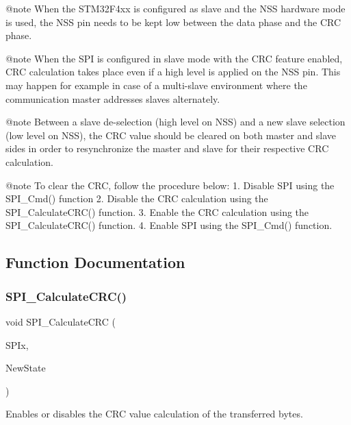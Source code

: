 \begin{DoxyVerb}
@note When the STM32F4xx is configured as slave and the NSS hardware mode is 
      used, the NSS pin needs to be kept low between the data phase and the CRC 
      phase.

@note When the SPI is configured in slave mode with the CRC feature enabled, CRC
      calculation takes place even if a high level is applied on the NSS pin. 
      This may happen for example in case of a multi-slave environment where the 
      communication master addresses slaves alternately.

@note Between a slave de-selection (high level on NSS) and a new slave selection 
      (low level on NSS), the CRC value should be cleared on both master and slave
      sides in order to resynchronize the master and slave for their respective 
      CRC calculation.

@note To clear the CRC, follow the procedure below:
        1. Disable SPI using the SPI_Cmd() function
        2. Disable the CRC calculation using the SPI_CalculateCRC() function.
        3. Enable the CRC calculation using the SPI_CalculateCRC() function.
        4. Enable SPI using the SPI_Cmd() function.\end{DoxyVerb}
 

\subsection{Function Documentation}
\mbox{\label{group__SPI__Group3_ga64f7276d119e6cb58afc100f8832adb0}} 
\subsubsection{S\+P\+I\+\_\+\+Calculate\+C\+R\+C()}
{\footnotesize\ttfamily void S\+P\+I\+\_\+\+Calculate\+C\+RC (\begin{DoxyParamCaption}\item[{\textbf{ S\+P\+I\+\_\+\+Type\+Def} $\ast$}]{S\+P\+Ix,  }\item[{\textbf{ Functional\+State}}]{New\+State }\end{DoxyParamCaption})}



Enables or disables the C\+RC value calculation of the transferred bytes. 


